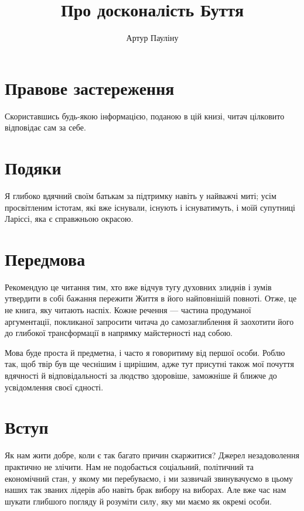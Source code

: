 \documentclass[oneside, 12pt]{book}
\title{Про досконалість Буття}
\author{Артур Пауліну}
\date{}
\begin{document}
\maketitle

\chapter*{Правове застереження}
\thispagestyle{empty}

Скориставшись будь-якою інформацією, поданою в цій книзі, читач цілковито відповідає сам за себе.

\chapter*{Подяки}
\thispagestyle{empty}

Я глибоко вдячний своїм батькам за підтримку навіть у найважчі миті; усім просвітленим істотам, які вже існували, існують і існуватимуть, і моїй супутниці Ларіссі, яка є справжньою окрасою.

\tableofcontents
\thispagestyle{empty}

\chapter*{Передмова}

Рекомендую це читання тим, хто вже відчув тугу духовних злиднів і зумів утвердити в собі бажання пережити Життя в його найповнішій повноті. Отже, це не книга, яку читають наспіх. Кожне речення --- частина продуманої аргументації, покликаної запросити читача до самозаглиблення й заохотити його до глибокої трансформації в напрямку майстерності над собою.

Мова буде проста й предметна, і часто я говоритиму від першої особи. Роблю так, щоб твір був ще чеснішим і щирішим, адже тут присутні також мої почуття вдячності й відповідальності за людство здоровіше, заможніше й ближче до усвідомлення своєї єдності.

\chapter*{Вступ}

Як нам жити добре, коли є так багато причин скаржитися? Джерел незадоволення практично не злічити. Нам не подобається соціальний, політичний та економічний стан, у якому ми перебуваємо, і ми зазвичай звинувачуємо в цьому наших так званих лідерів або навіть брак вибору на виборах. Але вже час нам шукати глибшого погляду й розуміти силу, яку ми маємо як окремі особи.
\end{document}
